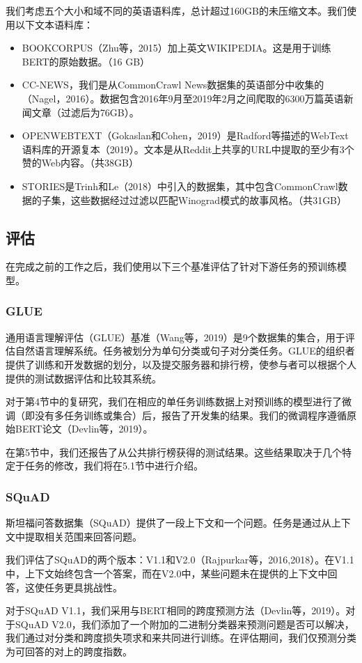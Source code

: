 \documentclass[lang=cn,11pt,a4paper,twocolumn]{elegantpaper}
\begin{document}
我们考虑五个大小和域不同的英语语料库，总计超过160GB的未压缩文本。我们使用以下文本语料库：
\begin{itemize}
  \item BOOKCORPUS（Zhu等，2015）加上英文WIKIPEDIA。这是用于训练BERT的原始数据。（16 GB）
  \item CC-NEWS，我们是从CommonCrawl News数据集的英语部分中收集的（Nagel，2016）。数据包含2016年9月至2019年2月之间爬取的6300万篇英语新闻文章（过滤后为76GB）。
  \item OPENWEBTEXT（Gokaslan和Cohen，2019）是Radford等描述的WebText语料库的开源复本（2019）。文本是从Reddit上共享的URL中提取的至少有3个赞的Web内容。（共38GB）
  \item STORIES是Trinh和Le（2018）中引入的数据集，其中包含CommonCrawl数据的子集，这些数据经过过滤以匹配Winograd模式的故事风格。（共31GB）
\end{itemize}

\subsection{评估}
在完成之前的工作之后，我们使用以下三个基准评估了针对下游任务的预训练模型。
\subsubsection{GLUE}
通用语言理解评估（GLUE）基准（Wang等，2019）是9个数据集的集合，用于评估自然语言理解系统。任务被划分为单句分类或句子对分类任务。GLUE的组织者提供了训练和开发数据的划分，以及提交服务器和排行榜，使参与者可以根据个人提供的测试数据评估和比较其系统。

对于第4节中的复研究，我们在相应的单任务训练数据上对预训练的模型进行了微调（即没有多任务训练或集合）后，报告了开发集的结果。我们的微调程序遵循原始BERT论文（Devlin等，2019）。

在第5节中，我们还报告了从公共排行榜获得的测试结果。这些结果取决于几个特定于任务的修改，我们将在5.1节中进行介绍。
\subsubsection{SQuAD}
斯坦福问答数据集（SQuAD）提供了一段上下文和一个问题。任务是通过从上下文中提取相关范围来回答问题。

我们评估了SQuAD的两个版本：V1.1和V2.0（Rajpurkar等，2016,2018）。在V1.1中，上下文始终包含一个答案，而在V2.0中，某些问题未在提供的上下文中回答，这使任务更具挑战性。

对于SQuAD V1.1，我们采用与BERT相同的跨度预测方法（Devlin等，2019）。对于SQuAD V2.0，我们添加了一个附加的二进制分类器来预测问题是否可以解决，我们通过对分类和跨度损失项求和来共同进行训练。在评估期间，我们仅预测分类为可回答的对上的跨度指数。
\end{document}
